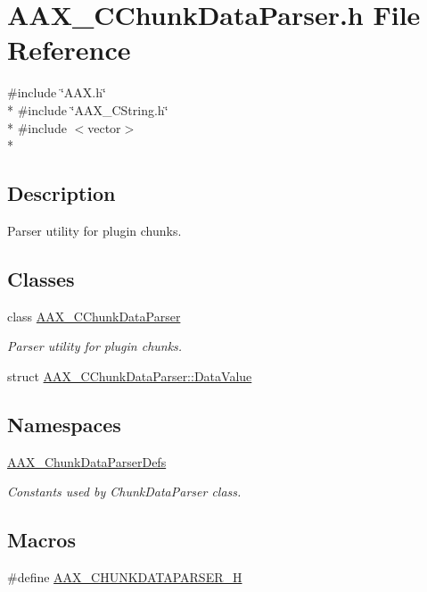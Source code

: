 \hypertarget{a00168}{}\section{A\+A\+X\+\_\+\+C\+Chunk\+Data\+Parser.\+h File Reference}
\label{a00168}
{\ttfamily \#include \char`\"{}A\+A\+X.\+h\char`\"{}}\\*
{\ttfamily \#include \char`\"{}A\+A\+X\+\_\+\+C\+String.\+h\char`\"{}}\\*
{\ttfamily \#include $<$vector$>$}\\*


\subsection{Description}
Parser utility for plugin chunks. 

\subsection*{Classes}
\begin{DoxyCompactItemize}
\item 
class \hyperlink{a00014}{A\+A\+X\+\_\+\+C\+Chunk\+Data\+Parser}
\begin{DoxyCompactList}\small\item\em Parser utility for plugin chunks. \end{DoxyCompactList}\item 
struct \hyperlink{a00144}{A\+A\+X\+\_\+\+C\+Chunk\+Data\+Parser\+::\+Data\+Value}
\end{DoxyCompactItemize}
\subsection*{Namespaces}
\begin{DoxyCompactItemize}
\item 
 \hyperlink{a00321}{A\+A\+X\+\_\+\+Chunk\+Data\+Parser\+Defs}
\begin{DoxyCompactList}\small\item\em Constants used by Chunk\+Data\+Parser class. \end{DoxyCompactList}\end{DoxyCompactItemize}
\subsection*{Macros}
\begin{DoxyCompactItemize}
\item 
\#define \hyperlink{a00168_af6b3d6065173ac55090ce0dec7b2b31a}{A\+A\+X\+\_\+\+C\+H\+U\+N\+K\+D\+A\+T\+A\+P\+A\+R\+S\+E\+R\+\_\+\+H}
\end{DoxyCompactItemize}
